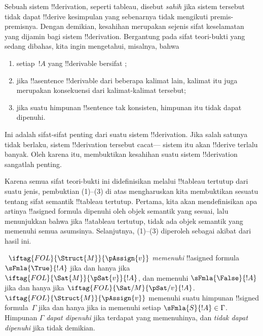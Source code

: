 \documentclass[../../../include/open-logic-section]{subfiles}
\begin{document}
      {}
      {}


\begin{explain}
Sebuah sistem !!{derivation}, seperti tableau, disebut \emph{sahih} jika
sistem tersebut tidak dapat !!{derive} kesimpulan yang sebenarnya tidak
mengikuti premis-premisnya. Dengan demikian, kesahihan merupakan sejenis
sifat keselamatan yang dijamin bagi sistem !!{derivation}. Bergantung
pada sifat teori-bukti yang sedang dibahas, kita ingin mengetahui,
misalnya, bahwa
\begin{enumerate}
\item setiap~$!A$ yang !!{derivable} bersifat
  ;
\item jika !!a{sentence} !!{derivable} dari beberapa kalimat lain,
  kalimat itu juga merupakan konsekuensi dari kalimat-kalimat tersebut;
\item jika suatu himpunan !!{sentence} tak konsisten, himpunan itu tidak
  dapat dipenuhi.
\end{enumerate}
Ini adalah sifat-sifat penting dari suatu sistem !!{derivation}. Jika
salah satunya tidak berlaku, sistem !!{derivation} tersebut cacat---
sistem itu akan !!{derive} terlalu banyak. Oleh karena itu, membuktikan
kesahihan suatu sistem !!{derivation} sangatlah penting.

Karena semua sifat teori-bukti ini didefinisikan melalui !!{tableau}
tertutup dari suatu jenis, pembuktian (1)--(3) di atas mengharuskan kita
membuktikan sesuatu tentang sifat semantik !!{tableau} tertutup. Pertama,
kita akan mendefinisikan apa artinya !!a{signed formula} dipenuhi oleh
objek semantik yang sesuai, lalu menunjukkan bahwa jika !!a{tableau}
tertutup, tidak ada objek semantik yang memenuhi semua asumsinya.
Selanjutnya, (1)--(3)
diperoleh sebagai akibat dari hasil ini.
\end{explain}

\begin{defn}
~$\iftag{FOL}{\Struct{M}}{\pAssign{v}}$
\emph{memenuhi} !!a{signed formula} $\sFmla{\True}{!A}$ jika dan hanya
jika $\iftag{FOL}{\Sat{M}}{\pSat{v}}{!A}$, dan memenuhi
$\sFmla{\False}{!A}$ jika dan hanya jika
$\iftag{FOL}{\Sat/{M}}{\pSat/{v}}{!A}$.
$\iftag{FOL}{\Struct{M}}{\pAssign{v}}$ memenuhi suatu himpunan
!!{signed formula}~$\Gamma$ jika dan hanya jika ia memenuhi setiap
$\sFmla{S}{!A} \in \Gamma$. Himpunan $\Gamma$ \emph{dapat dipenuhi}
jika terdapat  yang
memenuhinya, dan \emph{tidak dapat dipenuhi} jika tidak demikian.
\end{defn}
\end{document}
